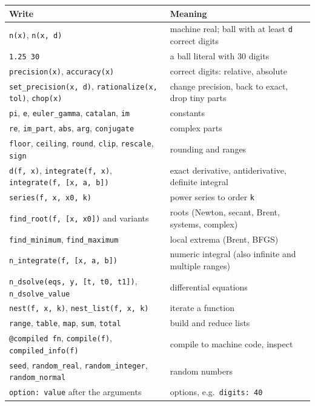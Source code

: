 \documentclass[11pt,a4paper]{article}
\newcommand{\code}[1]{\texttt{#1}}
\begin{document}
\begin{center}
\small
\begin{tabularx}{\linewidth}{@{}lX@{}}
\toprule
\textbf{Write} & \textbf{Meaning} \\
\midrule
\code{n(x)}, \code{n(x, d)} & machine real; ball with at least \code{d} correct digits \\
\code{1.25\char126 30} & a ball literal with 30 digits \\
\code{precision(x)}, \code{accuracy(x)} & correct digits: relative, absolute \\
\code{set\_precision(x, d)}, \code{rationalize(x, tol)}, \code{chop(x)} & change precision, back to exact, drop tiny parts \\
\code{pi}, \code{e}, \code{euler\_gamma}, \code{catalan}, \code{im} & constants \\
\code{re}, \code{im\_part}, \code{abs}, \code{arg}, \code{conjugate} & complex parts \\
\code{floor}, \code{ceiling}, \code{round}, \code{clip}, \code{rescale}, \code{sign} & rounding and ranges \\
\code{d(f, x)}, \code{integrate(f, x)}, \code{integrate(f, [x, a, b])} & exact derivative, antiderivative, definite integral \\
\code{series(f, x, x0, k)} & power series to order \code{k} \\
\code{find\_root(f, [x, x0])} and variants & roots (Newton, secant, Brent, systems, complex) \\
\code{find\_minimum}, \code{find\_maximum} & local extrema (Brent, BFGS) \\
\code{n\_integrate(f, [x, a, b])} & numeric integral (also infinite and multiple ranges) \\
\code{n\_dsolve(eqs, y, [t, t0, t1])}, \code{n\_dsolve\_value} & differential equations \\
\code{nest(f, x, k)}, \code{nest\_list(f, x, k)} & iterate a function \\
\code{range}, \code{table}, \code{map}, \code{sum}, \code{total} & build and reduce lists \\
\code{@compiled fn}, \code{compile(f)}, \code{compiled\_info(f)} & compile to machine code, inspect \\
\code{seed}, \code{random\_real}, \code{random\_integer}, \code{random\_normal} & random numbers \\
\code{option: value} after the arguments & options, e.g.\ \code{digits: 40} \\
\bottomrule
\end{tabularx}
\end{center}
\end{document}
